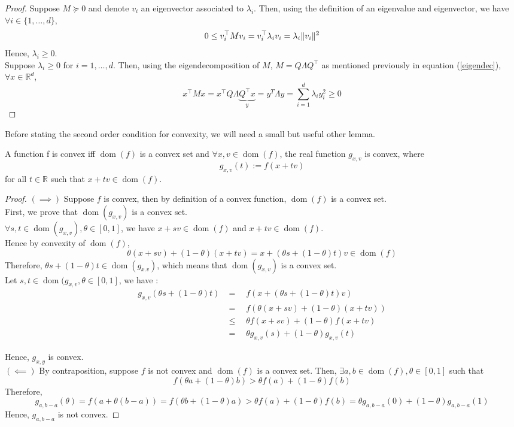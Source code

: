 \documentclass{article}
\DeclareMathOperator*{\dom}{dom}
\newcommand{\R}{\mathbb{R}}
\DeclarePairedDelimiter{\norm}{\lVert}{\rVert}
\begin{document}
\begin{proof}
Suppose $M\succeq 0$ and denote $v_i$ an eigenvector associated to $\lambda_i$. Then, using the definition of an eigenvalue and eigenvector, we have $\forall i \in \{1,\ldots,d\},$
\[
0 \leq v_i^\top M v_i = v_i^\top \lambda_i v_i =\lambda_i \norm{v_i}^2
\]
Hence, $\lambda_i\geq 0$.\\

Suppose $\lambda_i \geq 0$ for $i=1,\ldots,d$. Then, using the eigendecomposition of $M$, $M=Q \Lambda Q^\top$ as mentioned previously in equation (\ref{eigendec}), $\forall x \in \R^d$,
\[
    x^\top M x = x^\top Q \Lambda \underbrace{Q^\top x}_{y} = y^T \Lambda y = \sum_{i=1}^d \lambda_i y_i^2\geq 0
\]
\end{proof}

Before stating the second order condition for convexity, we will need a small but useful other lemma.

\begin{lemma}\label{line}
A function f is convex iff $\dom(f)$ is a convex set and $\forall x, v \in \dom(f)$, the real function $g_{x,v}$ is convex, where
$$g_{x,v}(t):=f(x+tv)$$
for all $t\in \R$ such that $x+tv\in\dom(f)$.
\end{lemma}{}

\begin{proof}
$(\implies)$ Suppose $f$ is convex, then by definition of a convex function, $\dom(f)$ is a convex set.\\

First, we prove that $\dom(g_{x,v})$ is a convex set.\\

$\forall s,t\in \dom(g_{x,v}), \theta\in[0,1]$, we have $x+sv\in\dom(f)$ and $x+tv\in\dom(f)$.\\

Hence by convexity of $\dom(f)$,
\[\theta (x+sv) + (1-\theta)(x+tv)=x+(\theta s + (1-\theta)t)v \in\dom(f)\]
Therefore, $\theta s + (1-\theta)t\in\dom(g_{x.v})$, which means that $\dom(g_{x,v})$ is a convex set.\\

Let $s,t\in\dom(g_{x,v},\theta\in[0,1]$, we have :
\begin{align*}
g_{x,v}(\theta s+(1-\theta) t) &=\quad f(x+(\theta s+(1-\theta) t)v)\\
&=\quad f(\theta(x+sv)+(1-\theta)(x+tv))\\
&\leq\quad \theta f(x+sv) + (1-\theta)f(x+tv)\\
&=\quad\theta g_{x,v}(s) + (1-\theta)g_{x,v}(t) 
\end{align*}

Hence, $g_{x,y}$ is convex.\\

$(\impliedby)$ By contraposition, suppose $f$ is not convex and $\dom(f)$ is a convex set. Then, $\exists a,b \in \dom(f), \theta \in [0,1]$ such that $$f(\theta a + (1-\theta)b)>\theta f(a) + (1-\theta)f(b)$$
Therefore,
\[
 g_{a,b-a}(\theta) = f(a+\theta (b-a)) = f(\theta b + (1-\theta)a) > \theta f(a) + (1-\theta)f(b)=\theta g_{a,b-a}(0) + (1-\theta) g_{a,b-a}(1)
\]
Hence, $g_{a,b-a}$ is not convex.

\end{proof}{}
\end{document}
